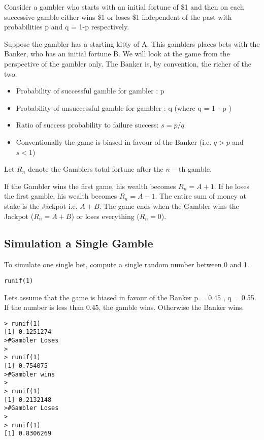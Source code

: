 \documentclass[a4paper,12pt]{article}
\begin{document}
Consider a gambler who starts with an initial fortune of \$1 and then on each successive gamble
either wins \$1 or loses \$1 independent of the past with probabilities p and q = 1-p respectively.

Suppose the gambler has a starting kitty of A.
This gamblers places bets with the Banker, who has an initial fortune B. We will look at the game from the perspective of the gambler only.
The Banker is, by convention, the richer of the two.

\begin{itemize}
\item Probability of successful gamble for gambler : p
\item Probability of unsuccessful gamble for gambler : q 	(where q =  1 - p )
\item Ratio of success probability to failure success:	$s = p / q$
\item Conventionally the game is biased in favour of the Banker (i.e. $q>p$ and $s<1$)
\end{itemize}

Let $R_n$ denote the Gamblers total fortune after the $n-$th gamble.

If the Gambler wins the first game, his wealth becomes $R_n =A+1$.
If he loses the first gamble, his wealth becomes $R_n = A-1$.
The entire sum of money at stake is the Jackpot i.e.   $A+B$.
The game ends when the Gambler wins the Jackpot ($R_n = A+B$) or loses everything ($R_n = 0$).


\subsection{Simulation a Single Gamble}


To simulate one single bet, compute a single random number between 0 and 1.
\begin{framed}
\begin{verbatim}
runif(1)
\end{verbatim}
\end{framed}

Lets assume that the game is biased in favour of the Banker
p = 0.45 , q = 0.55.
If the number is less than 0.45, the gamble wins. Otherwise the Banker wins.

\begin{verbatim}
> runif(1)
[1] 0.1251274
>#Gambler Loses
>
> runif(1)
[1] 0.754075
>#Gambler wins
>
> runif(1)
[1] 0.2132148
>#Gambler Loses
>
> runif(1)
[1] 0.8306269
\end{verbatim}
\end{document}
